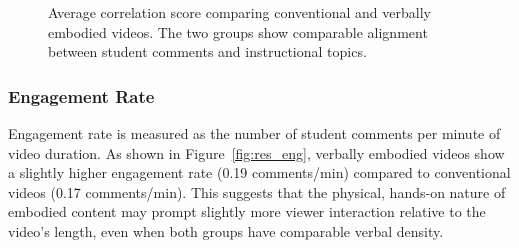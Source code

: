 \begin{figure}[h!]
    \centering
    \caption{Average correlation score comparing conventional and verbally embodied videos. The two groups show comparable alignment between student comments and instructional topics.}
    \label{fig:res_corr}
\end{figure}

\subsubsection{Engagement Rate}
Engagement rate is measured as the number of student comments per minute of video duration. As shown in Figure~\ref{fig:res_eng}, verbally embodied videos show a slightly higher engagement rate (0.19 comments/min) compared to conventional videos (0.17 comments/min). This suggests that the physical, hands-on nature of embodied content may prompt slightly more viewer interaction relative to the video's length, even when both groups have comparable verbal density.

